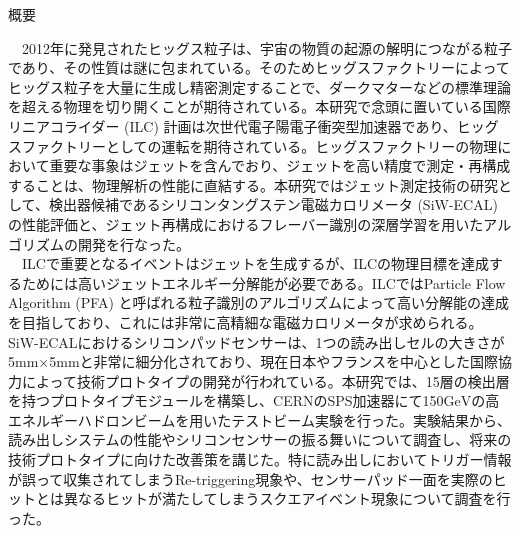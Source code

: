 
\begin{center}
\iffalse
\thispagestyle{empty}
{\Large 修士論文テンプレート}\\
九州大学大学院 理学府 物理学専攻 \\ 粒子物理学分野 素粒子実験研究室 \\
素粒子\ 実験 \\[1ex] 指導教員\ 氏\ 名\\ 　 \\
\fi
{\huge 概要}\\
\end{center}
　2012年に発見されたヒッグス粒子は、宇宙の物質の起源の解明につながる粒子であり、その性質は謎に包まれている。そのためヒッグスファクトリーによってヒッグス粒子を大量に生成し精密測定することで、ダークマターなどの標準理論を超える物理を切り開くことが期待されている。本研究で念頭に置いている国際リニアコライダー (ILC) 計画は次世代電子陽電子衝突型加速器であり、ヒッグスファクトリーとしての運転を期待されている。ヒッグスファクトリーの物理において重要な事象はジェットを含んでおり、ジェットを高い精度で測定・再構成することは、物理解析の性能に直結する。本研究ではジェット測定技術の研究として、検出器候補であるシリコンタングステン電磁カロリメータ (SiW-ECAL) の性能評価と、ジェット再構成におけるフレーバー識別の深層学習を用いたアルゴリズムの開発を行なった。\\
　ILCで重要となるイベントはジェットを生成するが、ILCの物理目標を達成するためには高いジェットエネルギー分解能が必要である。ILCではParticle Flow Algorithm (PFA) と呼ばれる粒子識別のアルゴリズムによって高い分解能の達成を目指しており、これには非常に高精細な電磁カロリメータが求められる。SiW-ECALにおけるシリコンパッドセンサーは、1つの読み出しセルの大きさが5mm$\times$5mmと非常に細分化されており、現在日本やフランスを中心とした国際協力によって技術プロトタイプの開発が行われている。本研究では、15層の検出層を持つプロトタイプモジュールを構築し、CERNのSPS加速器にて150$\mathrm{GeV}$の高エネルギーハドロンビームを用いたテストビーム実験を行った。実験結果から、読み出しシステムの性能やシリコンセンサーの振る舞いについて調査し、将来の技術プロトタイプに向けた改善策を講じた。特に読み出しにおいてトリガー情報が誤って収集されてしまうRe-triggering現象や、センサーパッド一面を実際のヒットとは異なるヒットが満たしてしまうスクエアイベント現象について調査を行った。\\
